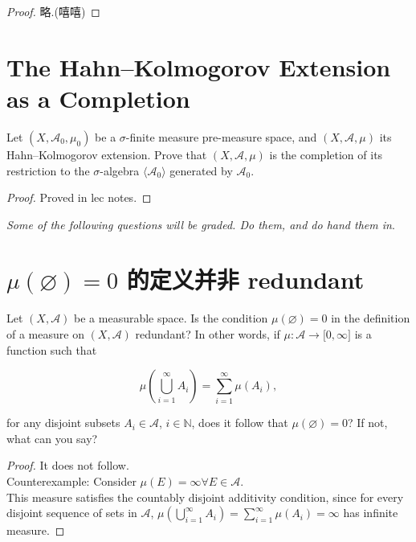 \documentclass{qlnotes-export}
\begin{document}
\begin{proof}

略.(嘻嘻)

\end{proof}

\section{The Hahn--Kolmogorov Extension as a Completion}\label{the-hahnkolmogorov-extension-as-a-completion}

Let \((X,\mathcal{A}_{0},\mu_{0})\) be a \(\sigma\)-finite measure pre-measure space, and \((X,\mathcal{A},\mu)\) its Hahn--Kolmogorov extension. Prove that \((X,\mathcal{A},\mu)\) is the completion of its restriction to the \(\sigma\)-algebra \(\langle\mathcal{A}_{0}\rangle\) generated by \(\mathcal{A}_{0}\).

\begin{proof}

Proved in lec notes.

\end{proof}

\emph{Some of the following questions will be graded. Do them, and do hand them in}.

\section{\texorpdfstring{\(\mu(\varnothing) = 0\) 的定义并非 redundant}{\textbackslash mu(\textbackslash varnothing) = 0 的定义并非 redundant}}\label{muemptyset-0-ux7684ux5b9aux4e49ux5e76ux975e-redundant}

Let \((X,\mathcal{A})\) be a measurable space. Is the condition \(\mu(\varnothing) = 0\) in the definition of a measure on \((X,\mathcal{A})\) redundant? In other words, if \(\mu:\mathcal{A}\rightarrow\lbrack 0,\infty\rbrack\) is a function such that

\[\mu\left( {\bigcup\limits_{i = 1}^{\infty}A_{i}} \right) = \sum\limits_{i = 1}^{\infty}\mu(A_{i}),\]

for any disjoint subsets \(A_{i} \in \mathcal{A}\), \(i \in {\mathbb{N}}\), does it follow that \(\mu(\varnothing) = 0\)? If not, what can you say?

\begin{proof}

It does not follow.\\
Counterexample: Consider \(\mu(E) = \infty\forall E \in \mathcal{A}\).\\
This measure satisfies the countably disjoint additivity condition, since for every disjoint sequence of sets in \(\mathcal{A}\), \(\mu\left( {\bigcup_{i = 1}^{\infty}A_{i}} \right) = \sum_{i = 1}^{\infty}\mu(A_{i}) = \infty\) has infinite measure.

\end{proof}
\end{document}
